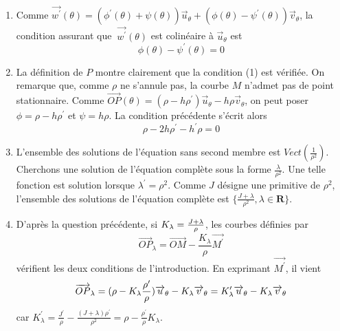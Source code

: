\begin{enumerate}
\item  Comme $\overrightarrow{w^{\prime }}(\theta )=(\phi ^{\prime }(\theta
)+\psi (\theta ))\overrightarrow{u}_{\theta }+(\phi (\theta )-\psi ^{\prime
}(\theta ))\overrightarrow{v}_{\theta }$, la condition assurant que $\
\overrightarrow{w^{\prime }}(\theta )$ est colin\'{e}aire \`{a} $%
\overrightarrow{u}_{\theta }$ est 
\[
\phi (\theta )-\psi ^{\prime }(\theta )=0 
\]

\item  La d\'{e}finition de $P$ montre clairement que la condition (1) est
v\'{e}rifi\'{e}e. On remarque que, comme $\rho $ ne s'annule pas, la courbe $%
M$ n'admet pas de point stationnaire.\newline
Comme $\overrightarrow{OP}(\theta )=(\rho -h\rho ^{\prime })\overrightarrow{u%
}_{\theta }-h\rho \overrightarrow{v}_{\theta }$, on peut poser $\phi =\rho
-h\rho ^{\prime }$ et $\psi =h\rho $. La condition pr\'{e}c\'{e}dente
s'\'{e}crit alors 
\[
\rho -2h\rho ^{\prime }-h^{\prime }\rho =0 
\]

\item  L'ensemble des solutions de l'\'{e}quation sans second membre est $%
Vect(\frac{1}{\rho ^{2}})$. Cherchons une solution de l'\'{e}quation
compl\`{e}te sous la forme $\frac{\lambda }{\rho ^{2}}$. Une telle fonction
est solution lorsque $\lambda ^{\prime }=\rho ^{2}$. Comme $J$ d\'{e}signe
une primitive de $\rho ^{2}$, l'ensemble des solutions de l'\'{e}quation
compl\`{e}te est $\{\frac{J+\lambda }{\rho ^{2}},\lambda \in \mathbf{R}\}$.

\item  D'apr\`{e}s la question pr\'{e}c\'{e}dente, si $K_{\lambda }=\frac{%
J+\lambda }{\rho }$, les courbes d\'{e}finies par 
\[
\overrightarrow{OP}_{\lambda }=\overrightarrow{OM}-\frac{K_{\lambda }}{\rho }%
\overrightarrow{M^{\prime }} 
\]
v\'{e}rifient les deux conditions de l'introduction. En exprimant $%
\overrightarrow{M^{\prime }}$, il vient 
\[
\overrightarrow{OP}_{\lambda }=(\rho -K_{\lambda }\frac{\rho ^{\prime }}{%
\rho })\overrightarrow{u}_{\theta }-K_{\lambda }\overrightarrow{v}_{\theta
}=K_{\lambda }^{\prime }\overrightarrow{u}_{\theta }-K_{\lambda }%
\overrightarrow{v}_{\theta } 
\]
car $K_{\lambda }^{\prime }=\frac{J^{\prime }}{\rho }-\frac{(J+\lambda )\rho
^{\prime }}{\rho ^{2}}=\rho -\frac{\rho ^{\prime }}{\rho }K_{\lambda }$.


\end{enumerate}
